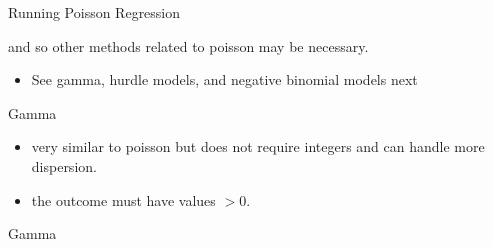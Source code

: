 \begin{frame}{Running Poisson Regression}

\Large
and so other methods related to poisson may be necessary.

\begin{itemize}
\tightlist
\item
  See gamma, hurdle models, and negative binomial models next
\end{itemize}

\end{frame}

\begin{frame}{Gamma}

\Large

\begin{itemize}
\tightlist
\item
  very similar to poisson but does not require integers and can handle
  more dispersion.
\item
  the outcome must have values \(> 0\).
\end{itemize}

\end{frame}

\begin{frame}[fragile]{Gamma}

\small

\begin{Shaded}
\begin{Highlighting}[]
\OperatorTok{$}\StringTok{ }\OperatorTok{$}\OperatorTok{+}\StringTok{ }
\StringTok{ }\OperatorTok{~}\StringTok{ }\OperatorTok{+}\StringTok{ }\OperatorTok{+}\StringTok{ }
              \NormalTok{)}
\end{Highlighting}
\end{Shaded}

\end{frame}

